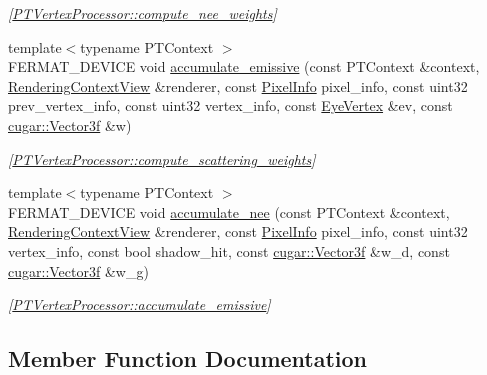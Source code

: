 \begin{DoxyCompactItemize}
\begin{DoxyCompactList}\small\item\em \mbox{[}\hyperlink{struct_p_t_vertex_processor_acca5b26b69481a1fada796bac4588b9b}{P\+T\+Vertex\+Processor\+::compute\+\_\+nee\+\_\+weights}\mbox{]} \end{DoxyCompactList}\item 
{\footnotesize template$<$typename P\+T\+Context $>$ }\\F\+E\+R\+M\+A\+T\+\_\+\+D\+E\+V\+I\+CE void \hyperlink{struct_p_t_vertex_processor_abde6145491f81a3db09b8f5bc60f2541}{accumulate\+\_\+emissive} (const P\+T\+Context \&context, \hyperlink{struct_rendering_context_view}{Rendering\+Context\+View} \&renderer, const \hyperlink{union_pixel_info}{Pixel\+Info} pixel\+\_\+info, const uint32 prev\+\_\+vertex\+\_\+info, const uint32 vertex\+\_\+info, const \hyperlink{struct_eye_vertex}{Eye\+Vertex} \&ev, const \hyperlink{structcugar_1_1_vector}{cugar\+::\+Vector3f} \&w)
\begin{DoxyCompactList}\small\item\em \mbox{[}\hyperlink{struct_p_t_vertex_processor_a832bbbc566d333cd7a0789690f5f7c62}{P\+T\+Vertex\+Processor\+::compute\+\_\+scattering\+\_\+weights}\mbox{]} \end{DoxyCompactList}\item 
{\footnotesize template$<$typename P\+T\+Context $>$ }\\F\+E\+R\+M\+A\+T\+\_\+\+D\+E\+V\+I\+CE void \hyperlink{struct_p_t_vertex_processor_a54a966b384fba210db9a87e0182d5a44}{accumulate\+\_\+nee} (const P\+T\+Context \&context, \hyperlink{struct_rendering_context_view}{Rendering\+Context\+View} \&renderer, const \hyperlink{union_pixel_info}{Pixel\+Info} pixel\+\_\+info, const uint32 vertex\+\_\+info, const bool shadow\+\_\+hit, const \hyperlink{structcugar_1_1_vector}{cugar\+::\+Vector3f} \&w\+\_\+d, const \hyperlink{structcugar_1_1_vector}{cugar\+::\+Vector3f} \&w\+\_\+g)
\begin{DoxyCompactList}\small\item\em \mbox{[}\hyperlink{struct_p_t_vertex_processor_abde6145491f81a3db09b8f5bc60f2541}{P\+T\+Vertex\+Processor\+::accumulate\+\_\+emissive}\mbox{]} \end{DoxyCompactList}\end{DoxyCompactItemize}


\subsection{Member Function Documentation}
\mbox{\label{struct_p_t_vertex_processor_abde6145491f81a3db09b8f5bc60f2541}} 
